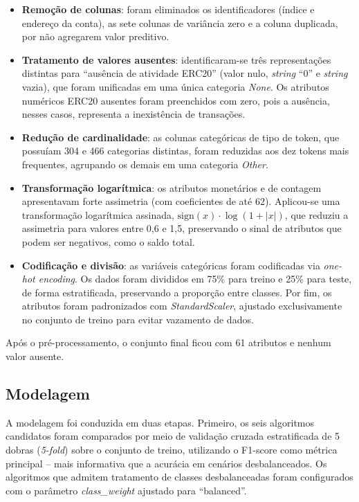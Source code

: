 \documentclass[12pt]{article}
\begin{document}
\begin{itemize}
\item \textbf{Remoção de colunas}: foram eliminados os identificadores
(índice e endereço da conta), as sete colunas de variância zero e a
coluna duplicada, por não agregarem valor preditivo.

\item \textbf{Tratamento de valores ausentes}: identificaram-se três
representações distintas para ``ausência de atividade ERC20'' (valor
nulo, \textit{string} ``0'' e \textit{string} vazia), que foram
unificadas em uma única categoria \textit{None}. Os atributos
numéricos ERC20 ausentes foram preenchidos com zero, pois a ausência,
nesses casos, representa a inexistência de transações.

\item \textbf{Redução de cardinalidade}: as colunas categóricas de tipo
de token, que possuíam 304 e 466 categorias distintas, foram reduzidas
aos dez tokens mais frequentes, agrupando os demais em uma categoria
\textit{Other}.

\item \textbf{Transformação logarítmica}: os atributos monetários e de
contagem apresentavam forte assimetria (com coeficientes de até 62).
Aplicou-se uma transformação logarítmica assinada,
$\text{sign}(x)\cdot\log(1+|x|)$, que reduziu a assimetria para valores
entre 0,6 e 1,5, preservando o sinal de atributos que podem ser
negativos, como o saldo total.

\item \textbf{Codificação e divisão}: as variáveis categóricas foram
codificadas via \textit{one-hot encoding}. Os dados foram divididos em
75\% para treino e 25\% para teste, de forma estratificada, preservando
a proporção entre classes. Por fim, os atributos foram padronizados com
\textit{StandardScaler}, ajustado exclusivamente no conjunto de treino
para evitar vazamento de dados.
\end{itemize}

Após o pré-processamento, o conjunto final ficou com 61 atributos e
nenhum valor ausente.

\subsection{Modelagem}

A modelagem foi conduzida em duas etapas. Primeiro, os seis algoritmos
candidatos foram comparados por meio de validação cruzada estratificada
de 5 dobras (\textit{5-fold}) sobre o conjunto de treino, utilizando o
F1-score como métrica principal -- mais informativa que a acurácia em
cenários desbalanceados. Os algoritmos que admitem tratamento de
classes desbalanceadas foram configurados com o parâmetro
\textit{class\_weight} ajustado para ``balanced''.
\end{document}

